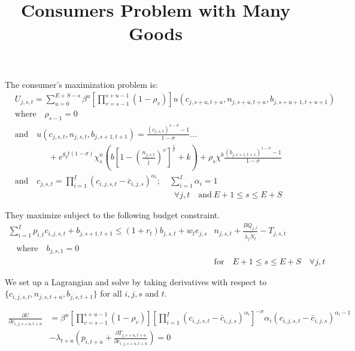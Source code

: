 \documentclass[letterpaper,11pt]{article}
\theoremstyle{definition}
\begin{document}
\title{Consumers Problem with Many Goods}
\maketitle
The consumer's maximization problem is:
\begin{equation}\label{EqUtilMax}
  \begin{split}
    &U_{j,s,t} = \sum_{u=0}^{E+S-s}\beta^u\left[\prod_{v=s-1}^{s+u-1}(1-\rho_v)\right] u\left(c_{j,s+u,t+u},n_{j,s+u,t+u},b_{j,s+u+1,t+u+1}\right) \\
    &\text{where}\quad \rho_{s-1}=0 \\
    &\text{and} \quad u\left(c_{j,s,t},n_{j,s,t},b_{j,s+1,t+1}\right) = \frac{\left(c_{j,s,t}\right)^{1-\sigma} - 1}{1-\sigma} ... \\
    &\qquad\qquad + e^{g_y t(1-\sigma)}\chi^n_s\left(b\left[1 - \left(\frac{n_{j,s,t}}{\tilde{l}}\right)^\upsilon\right]^\frac{1}{\upsilon} + k\right) + \rho_s\chi^b\frac{\left(b_{j,s+1,t+1}\right)^{1-\sigma} - 1}{1-\sigma} \\
    &\text{and} \quad c_{j,s,t} = \prod_{i=1}^I \left( c_{i,j,s,t} - \bar c_{i,j,s} \right) ^{\alpha_i}; \quad \sum_{i=1}^I \alpha_i = 1 \\
    &\quad\quad\quad\quad\quad\quad\quad\quad\quad\quad\quad\quad\quad\quad\quad\quad\quad\quad\quad\forall j,t\quad\text{and}\:E+1\leq s\leq E+S
  \end{split}
\end{equation}

They maximize subject to the following budget constraint.
\begin{equation}\label{EqBC}
  \begin{split}
    \sum_{i=1}^I p_{i,t}c_{i,j,s,t} + b_{j,s+1,t+1} \leq \left(1 + r_t\right) b_{j,s,t} + w_t e_{j,s}&n_{j,s,t} + \frac{BQ_{j,t}}{\lambda_j\tilde{N}_t} - T_{j,s,t} \\
    \quad\text{where}\quad b_{j,s,1} = 0 \\
    &\text{for} \quad E+1\leq s \leq E+S \quad \forall j,t
  \end{split}
\end{equation}

We set up a Lagrangian and solve by taking derivatives with respect to $\{c_{i,j,s,t},n_{j,s,t+u},b_{j,s,t+1}\}$ for all $i,j,s$ and $t$.

\begin{equation}\label{Eqcfoc}
  \begin{split}
  \frac{\partial U}{\partial c_{i,j,s+u,t+u}} & = \beta^u\left[\prod_{v=s-1}^{s+u-1}(1-\rho_v)\right] \left[ \prod_{i=1}^I \left( c_{i,j,s,t} - \bar c_{i,j,s} \right) ^{\alpha_i} \right]^{-\sigma}\alpha_i \left( c_{i,j,s,t} - \bar c_{i,j,s} \right)^{\alpha_i-1} \\
   & - \lambda_{t+u} \left( p_{i,t+u} + \frac{\partial T_{j,s+u,t+u}}{\partial c_{i,j,s+u,t+u}} \right)= 0
    \end{split}
\end{equation}
\end{document}
